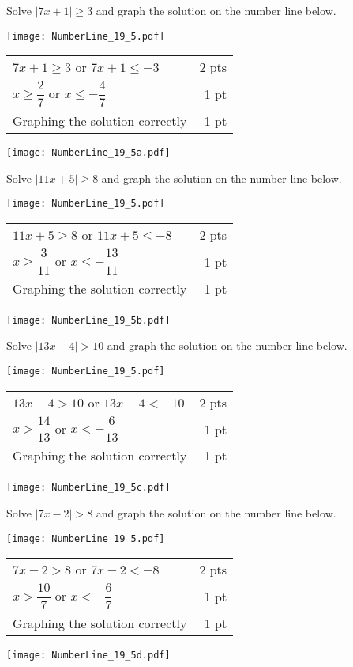 {
      Solve $\left| 7x+1 \right | \geq 3$ and graph the solution on the number line below.
      
\texttt{[image: NumberLine\_19\_5.pdf]}
}
{
	\begin{tabular}{l r}
	$7x+1 \geq 3$ or $7x+1 \leq -3$ & 2 pts\\
	$x\geq \dfrac{2}{7}$ or $x\leq -\dfrac{4}{7}$ & 1 pt\\
	Graphing the solution correctly& 1 pt
	\end{tabular}
	
\bs \texttt{[image: NumberLine\_19\_5a.pdf]}
}

{
      Solve $\left| 11x+5 \right | \geq 8$ and graph the solution on the number line below.
      
\texttt{[image: NumberLine\_19\_5.pdf]}
}
{
	\begin{tabular}{l r}
	$11x+5 \geq 8$ or $11x+5 \leq -8$ & 2 pts\\
	$x\geq \dfrac{3}{11}$ or $x\leq -\dfrac{13}{11}$ & 1 pt\\
	Graphing the solution correctly& 1 pt 
	\end{tabular}
	
\bs \texttt{[image: NumberLine\_19\_5b.pdf]}
}

{
      Solve $\left| 13x-4\right | > 10$ and graph the solution on the number line below.
      
\texttt{[image: NumberLine\_19\_5.pdf]}
}
{
	\begin{tabular}{l r}
	$13x-4 > 10$ or $13x-4 < -10$ & 2 pts\\
	$x>\dfrac{14}{13}$ or $x< -\dfrac{6}{13}$ & 1 pt\\
	Graphing the solution correctly& 1 pt 
	\end{tabular}
	
\bs \texttt{[image: NumberLine\_19\_5c.pdf]}
}

{
      Solve $\left| 7x-2 \right | > 8$ and graph the solution on the number line below.
      
\texttt{[image: NumberLine\_19\_5.pdf]}
}
{
	\begin{tabular}{l r}
	$7x-2>8$ or $7x-2<-8$ & 2 pts\\
	$x>\dfrac{10}{7}$ or $x< -\dfrac{6}{7}$ & 1 pt\\
	Graphing the solution correctly& 1 pt 
	\end{tabular}
	
\bs \texttt{[image: NumberLine\_19\_5d.pdf]}
}